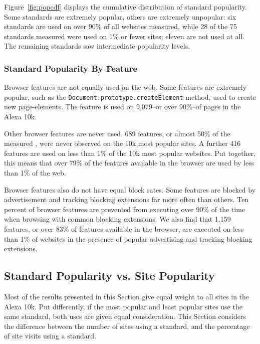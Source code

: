 Figure~\ref{fig:popcdf} displays the cumulative distribution of standard
popularity. Some standards are extremely popular, others are extremely
unpopular: six standards are used on over 90\% of all websites measured, while
28 of the 75 standards measured were used on 1\% or fewer sites;
eleven are not used at all. The remaining standards saw intermediate
popularity levels.


\subsubsection{Standard Popularity By Feature}
Browser features are not equally used on the web.  Some features are extremely
popular, such as the \texttt{Document.prototype.createElement} method,
used to create new page-elements.  The feature is used on 9,079--or over
90\%--of pages in the Alexa 10k.

Other browser features are never used.  689 features, or almost 50\% of the
measured \numfeatures, were never observed on the 10k most popular
sites.  A further 416 features are used on less than 1\% of the 10k most
popular websites.  Put together, this means that over 79\% of the features
available in the browser are used by less than 1\% of the web.

Browser features also do not have equal block rates. Some features
are blocked by advertisement and tracking blocking extensions far more often
than others.  Ten percent of browser features are prevented from executing over
90\% of the time when browsing with common blocking extensions.   We also find
that 1,159 features, or over 83\% of features available in the browser, are
executed on less than 1\% of websites in the presence of popular advertising
and tracking blocking extensions.


\subsection{Standard Popularity vs. Site Popularity}
\label{measurement:results:popularity}



Most of the results presented in this Section give equal weight to all sites in
the Alexa 10k.  Put differently, if the most popular and least popular sites use the same
standard, both uses are given equal consideration.  This Section considers
the difference between the number of sites using a standard, and the
percentage of site visits using a standard.

